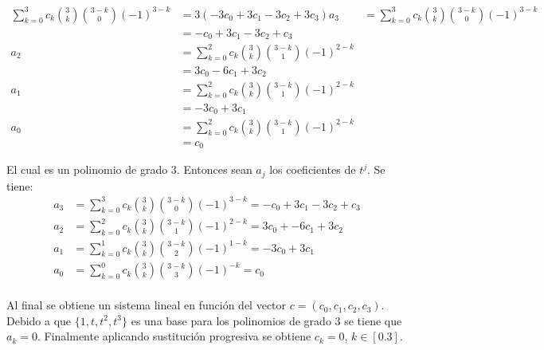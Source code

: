 \begin{frame}
\begin{solution}
        \begin{align*}
            \sum_{k=0}^{3}{c_k\binom{3}{k}\binom{3-k}{0}(-1)^{3-k}} & =3(-3c_0+3c_1-3c_2+3c_3)
            a_{3}                                                   & =\sum_{k=0}^{3}{c_k\binom{3}{k}\binom{3-k}{0}(-1)^{3-k}} \\
                                                                    & =-c_0+3c_1-3c_2+c_3                                      \\
            a_{2}                                                   & =\sum_{k=0}^{2}{c_k\binom{3}{k}\binom{3-k}{1}(-1)^{2-k}} \\
                                                                    & =3c_0-6c_1+3c_2                                          \\
            a_{1}                                                   & =\sum_{k=0}^{2}{c_k\binom{3}{k}\binom{3-k}{1}(-1)^{2-k}} \\
                                                                    & =-3c_0+3c_1                                              \\
            a_{0}                                                   & =\sum_{k=0}^{2}{c_k\binom{3}{k}\binom{3-k}{1}(-1)^{2-k}} \\
                                                                    & =c_0
        \end{align*}
    \end{solution}
\end{frame}

\begin{frame}
    \begin{solution}
        El cual es un polinomio de grado $3$.
        Entonces sean $a_{j}$ los coeficientes de $t^{j}$.
        Se tiene:
        \begin{align*}
            a_3 & =\sum_{k=0}^{3}{c_k\binom{3}{k}\binom{3-k}{0}(-1)^{3-k}}=-c_0+3c_1-3c_2+c_3 \\
            a_2 & =\sum_{k=0}^{2}{c_k\binom{3}{k}\binom{3-k}{1}(-1)^{2-k}}=3c_0+-6c_1+3c_2    \\
            a_1 & =\sum_{k=0}^{1}{c_k\binom{3}{k}\binom{3-k}{2}(-1)^{1-k}}=-3c_0+3c_1         \\
            a_0 & =\sum_{k=0}^{0}{c_k\binom{3}{k}\binom{3-k}{3}(-1)^{-k}}=c_0                 \\
        \end{align*}

        Al final se obtiene un sistema lineal en función del vector $c=(c_0,c_1,c_2,c_3)$. Debido a que $\{1,t,t^2,t^3\}$ es una base para los polinomios de grado 3 se tiene que $a_k=0$. Finalmente aplicando sustitución progresiva se obtiene $c_k=0$, $k\in[0.3]$.
    \end{solution}
\end{frame}
